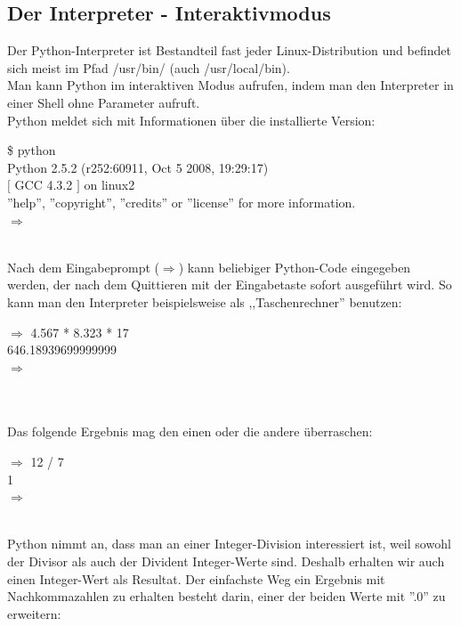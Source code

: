 \subsection{Der Interpreter - Interaktivmodus}
Der Python-Interpreter ist Bestandteil fast jeder Linux-Distribution und befindet sich meist im Pfad /usr/bin/ (auch /usr/local/bin). \\
Man kann Python im interaktiven Modus aufrufen, indem man den Interpreter in einer Shell ohne Parameter aufruft.\\
Python meldet sich mit Informationen über die installierte Version:
\\
\begin{MyConsoleBox}{
  \$ python \\
  Python 2.5.2 (r252:60911, Oct  5 2008, 19:29:17) \\
  $[$ GCC 4.3.2 $]$ on linux2 \\
  ''help'', ''copyright'', ''credits'' or ''license'' for more information. \\
  ${\Longrightarrow}$ \\
}\end{MyConsoleBox}
\\
Nach dem Eingabeprompt ($\Longrightarrow$) kann beliebiger Python-Code eingegeben werden, der nach dem Quittieren mit der Eingabetaste sofort ausgeführt wird. So kann man den Interpreter beispielsweise als ,,Taschenrechner'' benutzen:
\\
\begin{MyConsoleBox}{
  ${\Longrightarrow}$ 4.567 * 8.323 * 17 \\
  646.18939699999999 \\
  ${\Longrightarrow}$ \\
}\end{MyConsoleBox}
\\
\\
Das folgende Ergebnis mag den einen oder die andere überraschen:\\
\begin{MyConsoleBox}{
  ${\Longrightarrow}$ 12 / 7 \\
  1 \\
  ${\Longrightarrow}$ \\
}\end{MyConsoleBox}
\\
Python nimmt an, dass man an einer Integer-Division interessiert ist, weil sowohl der Divisor als auch der Divident Integer-Werte sind. Deshalb erhalten wir auch einen Integer-Wert als Resultat. Der einfachste Weg ein Ergebnis mit Nachkommazahlen zu erhalten besteht darin, einer der beiden Werte mit ''.0'' zu erweitern:
